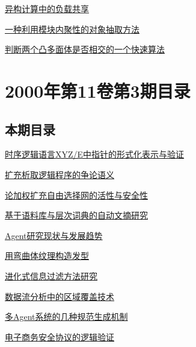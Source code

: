 \documentclass[a4paper]{article}
\begin{document}
\href{http://www.jos.org.cn/ch/reader/download_pdf.aspx?file_no=20000420&year_id=2000&quarter_id=4&falg=1}{异构计算中的负载共享}

\href{http://www.jos.org.cn/ch/reader/download_pdf.aspx?file_no=20000421&year_id=2000&quarter_id=4&falg=1}{一种利用模块内聚性的对象抽取方法}

\href{http://www.jos.org.cn/ch/reader/download_pdf.aspx?file_no=20000422&year_id=2000&quarter_id=4&falg=1}{判断两个凸多面体是否相交的一个快速算法}


\section{\textbf{2000年第11卷第3期目录}}
\subsection{本期目录}
\href{http://www.jos.org.cn/ch/reader/download_pdf.aspx?file_no=20000301&year_id=2000&quarter_id=3&falg=1}{时序逻辑语言XYZ/E中指针的形式化表示与验证}

\href{http://www.jos.org.cn/ch/reader/download_pdf.aspx?file_no=20000302&year_id=2000&quarter_id=3&falg=1}{扩充析取逻辑程序的争论语义}

\href{http://www.jos.org.cn/ch/reader/download_pdf.aspx?file_no=20000303&year_id=2000&quarter_id=3&falg=1}{论加权扩充自由选择网的活性与安全性}

\href{http://www.jos.org.cn/ch/reader/download_pdf.aspx?file_no=20000304&year_id=2000&quarter_id=3&falg=1}{基于语料库与层次词典的自动文摘研究}

\href{http://www.jos.org.cn/ch/reader/download_pdf.aspx?file_no=20000305&year_id=2000&quarter_id=3&falg=1}{Agent研究现状与发展趋势}

\href{http://www.jos.org.cn/ch/reader/download_pdf.aspx?file_no=20000306&year_id=2000&quarter_id=3&falg=1}{用弯曲体纹理构造发型}

\href{http://www.jos.org.cn/ch/reader/download_pdf.aspx?file_no=20000307&year_id=2000&quarter_id=3&falg=1}{进化式信息过滤方法研究}

\href{http://www.jos.org.cn/ch/reader/download_pdf.aspx?file_no=20000308&year_id=2000&quarter_id=3&falg=1}{数据流分析中的区域覆盖技术}

\href{http://www.jos.org.cn/ch/reader/download_pdf.aspx?file_no=20000309&year_id=2000&quarter_id=3&falg=1}{多Agent系统的几种规范生成机制}

\href{http://www.jos.org.cn/ch/reader/download_pdf.aspx?file_no=20000310&year_id=2000&quarter_id=3&falg=1}{电子商务安全协议的逻辑验证}
\end{document}
